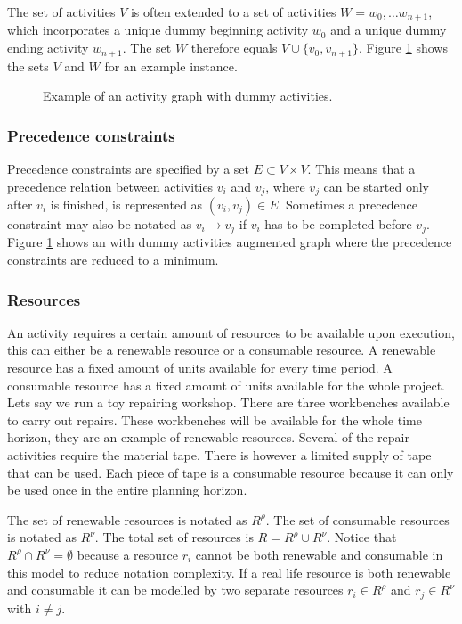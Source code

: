 \documentclass{article}
\newcommand{\renres}[0]{R^\rho} %
\newcommand{\conres}[0]{R^\nu} %
\newcommand{\res}[0]{R} %
\begin{document}
The set of activities $V$ is often extended to a set of activities $W = w_0, \ldots w_{n+1}$, which incorporates a unique dummy beginning activity $w_0$ and a unique dummy ending activity $w_{n+1}$. 
The set $W$ therefore equals $V \cup \{v_0, v_{n+1}\}$. 
Figure \ref{fig:activity_graph} shows the sets $V$ and $W$ for an example instance. 

\begin{figure}[h]
	\centering
	
	\caption{Example of an activity graph with dummy activities. }
	\label{fig:activity_graph}
\end{figure}

\subsubsection{Precedence constraints}
Precedence constraints are specified by a set $E \subset V \times V$.
This means that a precedence relation between activities $v_i$ and $v_j$, where $v_j$ can be started only after $v_i$ is finished, is represented as $(v_i, v_j) \in E$. 
Sometimes a precedence constraint may also be notated as $v_i \rightarrow v_j$ if $v_i$ has to be completed before $v_j$. 
Figure \ref{fig:activity_graph} shows an with dummy activities augmented graph where the precedence constraints are reduced to a minimum. 

\subsubsection{Resources}
An activity requires a certain amount of resources to be available upon execution, this can either be a renewable resource or a consumable resource. 
A renewable resource has a fixed amount of units available for every time period. 
A consumable resource has a fixed amount of units available for the whole project. 
Lets say we run a toy repairing workshop. There are three workbenches available to carry out repairs. 
These workbenches will be available for the whole time horizon, they are an example of renewable resources. 
Several of the repair activities require the material tape. 
There is however a limited supply of tape that can be used. 
Each piece of tape is a consumable resource because it can only be used once in the entire planning horizon. 

The set of renewable resources is notated as $\renres$. 
The set of consumable resources is notated as $\conres$. 
The total set of resources is $\res = \renres \cup \conres$. 
Notice that $\renres \cap \conres = \emptyset$ because a resource $r_i$ cannot be both renewable and consumable in this model to reduce notation complexity. 
If a real life resource is both renewable and consumable it can be modelled by two separate resources $r_i \in \renres$ and $r_j \in \conres$ with $i \neq j$. 
\end{document}

